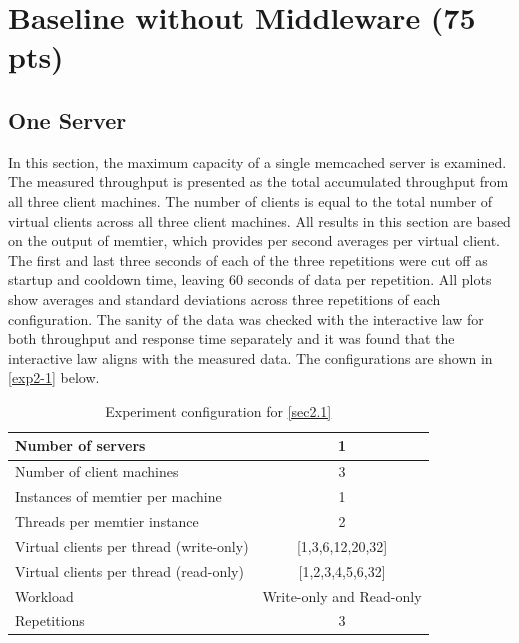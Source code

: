 \documentclass[11pt,a4paper]{article}
\begin{document}
\section{Baseline without Middleware (75 pts)} \label{section2}

\subsection{One Server} \label{sec2.1}

In this section, the maximum capacity of a single memcached server is examined. The measured throughput is presented as the total accumulated throughput from all three client machines. The number of clients is equal to the total number of virtual clients across all three client machines. All results in this section are based on the output of memtier, which provides per second averages per virtual client. The first and last three seconds of each of the three repetitions were cut off as startup and cooldown time, leaving 60 seconds of data per repetition. All plots show averages and standard deviations across three repetitions of each configuration. The sanity of the data was checked with the interactive law for both throughput and response time separately and it was found that the interactive law aligns with the measured data. The configurations are shown in \autoref{exp2-1} below.

\begin{center}
    \begin{table}
		\begin{tabular}{|l|c|}
			\hline Number of servers                        & 1                                 \\ 
			\hline Number of client machines                & 3                                 \\ 
			\hline Instances of memtier per machine         & 1                                 \\ 
			\hline Threads per memtier instance             & 2                                 \\
			\hline Virtual clients per thread (write-only)  & [1,3,6,12,20,32]                  \\ 
			\hline Virtual clients per thread (read-only)   & [1,2,3,4,5,6,32]                  \\ 
			\hline Workload                                 & Write-only and Read-only          \\
			\hline Repetitions                              & 3                                 \\ 
			\hline 
		\end{tabular}
		\caption{Experiment configuration for \autoref{sec2.1}} \label{exp2-1}
	\end{table}
\end{center}
\end{document}

